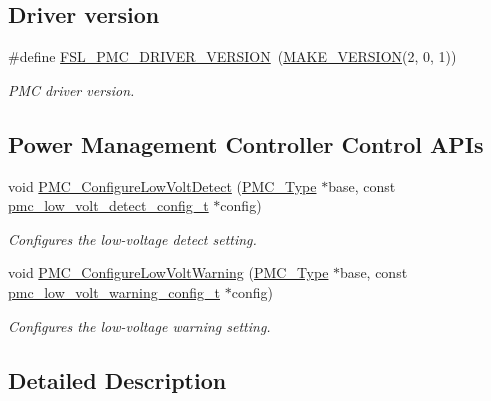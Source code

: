 \subsection*{Driver version}
\begin{DoxyCompactItemize}
\item 
\#define \mbox{\hyperlink{group__pmc_ga73519be5675b92701f27a75deec47471}{F\+S\+L\+\_\+\+P\+M\+C\+\_\+\+D\+R\+I\+V\+E\+R\+\_\+\+V\+E\+R\+S\+I\+ON}}~(\mbox{\hyperlink{group__ftfx__utilities_ga812138aa3315b0c6953c1a26130bcc37}{M\+A\+K\+E\+\_\+\+V\+E\+R\+S\+I\+ON}}(2, 0, 1))
\begin{DoxyCompactList}\small\item\em P\+MC driver version. \end{DoxyCompactList}\end{DoxyCompactItemize}
\subsection*{Power Management Controller Control A\+P\+Is}
\begin{DoxyCompactItemize}
\item 
void \mbox{\hyperlink{group__pmc_ga511f9618f4a4a78c0d18fb1f53ab5256}{P\+M\+C\+\_\+\+Configure\+Low\+Volt\+Detect}} (\mbox{\hyperlink{struct_p_m_c___type}{P\+M\+C\+\_\+\+Type}} $\ast$base, const \mbox{\hyperlink{group__pmc_ga6614b7fa35b6399db446c0d0e7304406}{pmc\+\_\+low\+\_\+volt\+\_\+detect\+\_\+config\+\_\+t}} $\ast$config)
\begin{DoxyCompactList}\small\item\em Configures the low-\/voltage detect setting. \end{DoxyCompactList}\item 
void \mbox{\hyperlink{group__pmc_ga711999faa5886861327da2dddadd2277}{P\+M\+C\+\_\+\+Configure\+Low\+Volt\+Warning}} (\mbox{\hyperlink{struct_p_m_c___type}{P\+M\+C\+\_\+\+Type}} $\ast$base, const \mbox{\hyperlink{group__pmc_ga8e06305a65f64f60fa3290e2d09123f7}{pmc\+\_\+low\+\_\+volt\+\_\+warning\+\_\+config\+\_\+t}} $\ast$config)
\begin{DoxyCompactList}\small\item\em Configures the low-\/voltage warning setting. \end{DoxyCompactList}\end{DoxyCompactItemize}


\subsection{Detailed Description}



